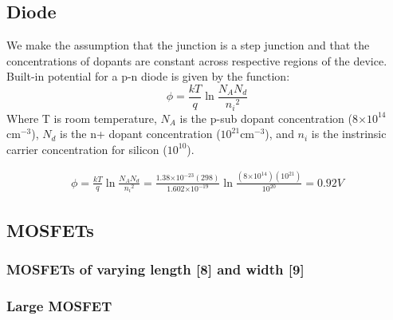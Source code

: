 \documentclass{article}
\providecommand{\e}[1]{\ensuremath{\times 10^{#1}}}
\begin{document}
\subsection{Diode}
We make the assumption that the junction is a step junction and that the concentrations of dopants are constant across respective regions of the device. Built-in potential for a p-n diode is given by the function:
\begin{equation}
\phi = \frac{kT}{q}\ln{\frac{N_AN_d}{{n_i}^{2}}}
\end{equation}
Where T is room temperature, $N_A$ is the p-sub dopant concentration (8\e{14}${\text{cm}^{-3}}$), $N_d$ is the n+ dopant concentration ($10^{21}{\text{cm}^{-3}}$), and $n_i$ is the instrinsic carrier concentration for silicon ($10^{10}$).

\begin{align*}
\phi = \frac{kT}{q}\ln{\frac{N_AN_d}{{n_i}^{2}}} = \frac{1.38\e{-23}(298)}{1.602\e{-19}}\ln{\frac{(8\e{14})(10^{21})}{{10^{20}}}} = 0.92 V
\end{align*}

\subsection{MOSFETs}
\subsubsection{MOSFETs of varying length [8] and width [9]}
\subsubsection{Large MOSFET}
\end{document}
